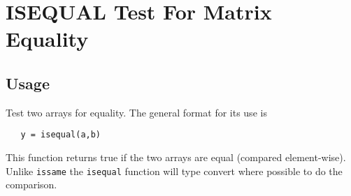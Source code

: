 \section{ISEQUAL Test For Matrix Equality}

\subsection{Usage}

Test two arrays for equality.  The general format
for its use is
\begin{verbatim}
   y = isequal(a,b)
\end{verbatim}
This function returns true if the two arrays are
equal (compared element-wise).  Unlike \verb|issame|
the \verb|isequal| function will type convert where
possible to do the comparison.
